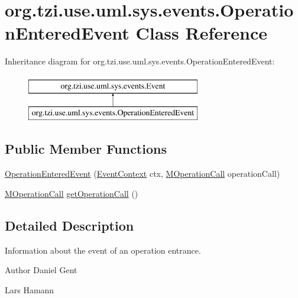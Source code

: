 \hypertarget{classorg_1_1tzi_1_1use_1_1uml_1_1sys_1_1events_1_1_operation_entered_event}{\section{org.\-tzi.\-use.\-uml.\-sys.\-events.\-Operation\-Entered\-Event Class Reference}
\label{classorg_1_1tzi_1_1use_1_1uml_1_1sys_1_1events_1_1_operation_entered_event}
}
Inheritance diagram for org.\-tzi.\-use.\-uml.\-sys.\-events.\-Operation\-Entered\-Event\-:\begin{figure}[H]
\begin{center}
\leavevmode
\includegraphics[height=2.000000cm]{classorg_1_1tzi_1_1use_1_1uml_1_1sys_1_1events_1_1_operation_entered_event}
\end{center}
\end{figure}
\subsection*{Public Member Functions}
\begin{DoxyCompactItemize}
\item 
\hyperlink{classorg_1_1tzi_1_1use_1_1uml_1_1sys_1_1events_1_1_operation_entered_event_adc955ff6141e159448ec5de2e696bedb}{Operation\-Entered\-Event} (\hyperlink{enumorg_1_1tzi_1_1use_1_1uml_1_1sys_1_1events_1_1tags_1_1_event_context}{Event\-Context} ctx, \hyperlink{classorg_1_1tzi_1_1use_1_1uml_1_1sys_1_1_m_operation_call}{M\-Operation\-Call} operation\-Call)
\item 
\hyperlink{classorg_1_1tzi_1_1use_1_1uml_1_1sys_1_1_m_operation_call}{M\-Operation\-Call} \hyperlink{classorg_1_1tzi_1_1use_1_1uml_1_1sys_1_1events_1_1_operation_entered_event_af2b10014653857893be9fd2bdca93988}{get\-Operation\-Call} ()
\end{DoxyCompactItemize}


\subsection{Detailed Description}
Information about the event of an operation entrance. \begin{DoxyAuthor}{Author}
Daniel Gent 

Lars Hamann 
\end{DoxyAuthor}



